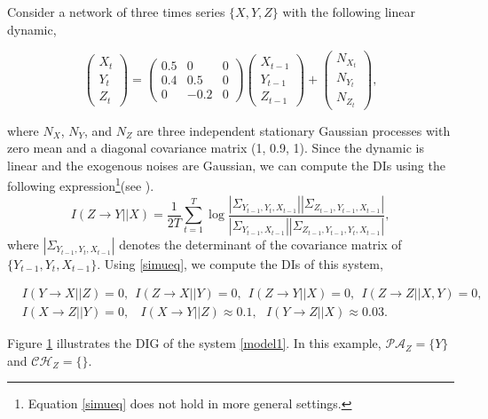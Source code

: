 \begin{example}\label{r1}
Consider a network of three times series $\{X,Y,Z\}$ with the following linear dynamic,
\begin{small}
\begin{equation}\label{model1}
\begin{pmatrix}
X_t \\
Y_t\\
Z_t
\end{pmatrix}=\begin{pmatrix}
0.5 & 0& 0\\
0.4 & 0.5 & 0\\
0 & -0.2 & 0
\end{pmatrix}\begin{pmatrix}
X_{t-1} \\
Y_{t-1}\\
Z_{t-1}
\end{pmatrix}+\begin{pmatrix}
N_{X_t} \\
N_{Y_t}\\
N_{Z_t}
\end{pmatrix},
\end{equation}
\end{small}
where $N_X$, $N_Y$, and $N_Z$ are three independent stationary Gaussian processes with zero mean and a diagonal covariance matrix (1, 0.9, 1). 
Since the dynamic is linear and the exogenous noises are Gaussian, we can compute the DIs using the following expression\footnote{Equation \eqref{simueq} does not hold in more general settings.}(see \citet{acc2014}).
\begin{equation}\label{simueq}
I(Z\rightarrow Y||X)=\frac{1}{2T}\sum_{t=1}^{T}\log\frac{|\Sigma_{Y_{t-1},Y_{t},X_{t-1}}||\Sigma_{Z_{t-1},Y_{t-1},X_{t-1}}|}{|\Sigma_{Y_{t-1},X_{t-1}}||\Sigma_{Z_{t-1},Y_{t-1},Y_{t},X_{t-1}}|},
\end{equation}
where $|\Sigma_{Y_{t-1},Y_{t},X_{t-1}}|$ denotes the determinant of the covariance matrix of $\{Y_{t-1},Y_{t},X_{t-1}\}$. Using \eqref{simueq}, we compute the DIs of this system,
\begin{small}
\begin{align}  \label{di_xyz}
&I(Y\rightarrow X||Z)=0,\ \ I(Z\rightarrow X||Y)=0,\ \ I(Z\rightarrow Y||X)=0,\ \ I(Z\rightarrow Z||X,Y)=0,\\
&I(X\rightarrow Z||Y)=0,\ \ \ \ I(X\rightarrow Y||Z)\approx 0.1, \ \ \ I(Y\rightarrow Z||X)\approx 0.03. \nonumber
\end{align}
\end{small}
Figure \ref{fig:example_dig} illustrates the DIG of the system \eqref{model1}. In this example, $\mathcal{PA}_Z=\{Y\}$ and $\mathcal{CH}_Z=\{\}$.
\begin{figure}[h]
\hspace{4cm}
\label{fig:example_dig}
\end{figure}
\end{example}



